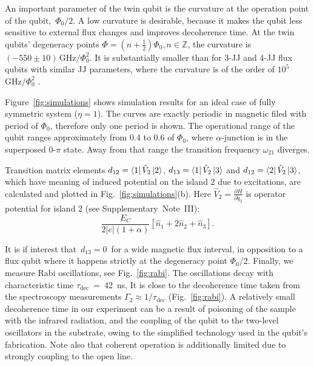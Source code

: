 \documentclass[%
reprint,
superscriptaddress,
bibnotes,
amsmath,
amssymb,
aps,
showkeys,
prb,
]{revtex4-1}
\newcommand{\iket}[1]{\ensuremath{\Ket{#1}}}
\newcommand{\ibra}[1]{\ensuremath{\Bra{#1}}}
\newcommand{\iabs}[1]{\ensuremath{\left|#1\right|}}
\begin{document}
An  important  parameter of the twin qubit is  the curvature at  the operation  point  of the  qubit, \,$\Phi_{0}/2$.  A  low curvature  is
desirable, because it  makes the  qubit less  sensitive to  external flux  changes and
improves  decoherence  time.   At   the  twin  qubits'  degeneracy  points
$      \Phi     =      (n+\frac{1}{2})\Phi_0,     n\in\mathbb{Z}      $,     the      curvature     is
$   (-550\pm10)\,\text{GHz}/\Phi_0^2  $.    It is substantially smaller than for 3-JJ and 4-JJ flux qubits with 
similar JJ parameters, where the curvature is of the order of 
$ 10^5$ $  \text{GHz}/\Phi_0^2$ \cite{Astafiev_2010, Stern_2014, Gustavsson_2012}. 

Figure~\ref{fig:simulations} shows simulation results for an ideal case of fully symmetric system ($\eta=1$). The curves are exactly periodic in magnetic filed with period of $\Phi_0$, therefore only one period is shown. The operational range of the qubit ranges approximately from 0.4 to 0.6 of $\Phi_0$, where $\alpha$-junction is in the superposed 0-$\pi$ state\cite{Shulga_2018}. Away from that range the transition frequency $\omega_{21}$ diverges.



Transition matrix elements $d_{12} = \ibra{1}\hat{V}_2\iket{2}$, $d_{13} = \ibra{1}\hat{V}_2\iket{3}$ and $d_{12} = \ibra{2}\hat{V}_2\iket{3}$, which have meaning of induced potential on the island 2 due to excitations, are calculated and plotted in Fig.~\ref{fig:simulations}(b). Here $\hat{V}_2 = \frac{\partial H}{\partial q_2}$ is operator potential for island 2 (see Supplementary~Note~III):
\begin{equation}
  \label{eq:dv2}
  \frac{E_{C}}{2\iabs{e}(1+\alpha)}\left[\hat{n}_1     +     2\hat{n}_2     +
    \hat{n}_3\right].
\end{equation}


\noindent It is if interest that \,$d_{13} = 0$\, for a wide magnetic flux interval, in opposition to a flux qubit where it happens strictly at the degeneracy point $\Phi_0/2$. Finally, we measure Rabi oscillations, see Fig.~\ref{fig:rabi}. The oscillations decay with characteristic time $\tau_{\text{dec}}$~=~42~ns, 
It is close to the decoherence time taken from the spectroscopy measurements $\Gamma_2\approx1/\tau_{\text{dec}}$ (Fig.~\ref{fig:rabi}). 
A relatively small decoherence time in our experiment can be a result of poisoning of  the sample
with  the infrared  radiation, and  the  coupling of the qubit to the two-level  oscillators in  the
substrate, owing to the simplified technology used in the qubit's fabrication. Note also that coherent operation is additionally limited due to strongly coupling to the open line. 
\end{document}

